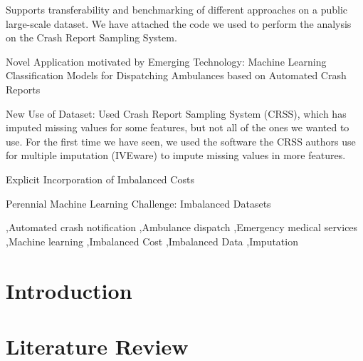 \documentclass[fleqn]{cas-sc}
\begin{document}
\begin{highlights}
	\item  Supports transferability and benchmarking of different approaches on a public large-scale dataset.  We have attached the code we used to perform the analysis on the Crash Report Sampling System.  
	\item Novel Application motivated by Emerging Technology:  Machine Learning Classification Models for Dispatching Ambulances based on Automated Crash Reports
	\item New Use of Dataset:  Used Crash Report Sampling System (CRSS), which has imputed missing values for some features, but not all of the ones we wanted to use.  For the first time we have seen, we used the software the CRSS authors use for multiple imputation (IVEware) to impute missing values in more features.  
	\item Explicit Incorporation of Imbalanced Costs
	\item Perennial Machine Learning Challenge:  Imbalanced Datasets
\end{highlights}

\begin{keywords}
 \sep Automated crash notification 
 \sep Ambulance dispatch 
 \sep Emergency medical services  
 \sep Machine learning 
 \sep Imbalanced Cost 
 \sep Imbalanced Data 
 \sep Imputation
\end{keywords}

\maketitle


%
%
%

%

\section{Introduction}\label{sec:Introduction}



\section{Literature Review}\label{LitReview}
\end{document}
